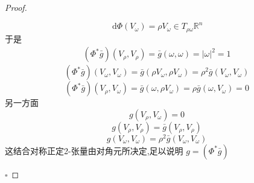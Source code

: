 \documentclass[../../几何与拓扑.tex]{subfiles}
\begin{document}
\begin{proof}
\begin{enumerate}
\[        \] \[
        \,\mathrm{d} \Phi \left( V_{ \omega } \right)= \rho V_{ \omega } \in T_{\rho  \omega }\mathbb{R} ^{n}
        \]于是 \[
        \begin{aligned}
            \left( \Phi ^{*} \bar{g} \right)\left( V_{\rho },V_{\rho } \right)= \bar{g}\left(  \omega , \omega  \right)   = \left|  \omega  \right|^{2}= 1 
        \end{aligned} 
        \] \[
        \left( \Phi ^{*}\bar{g} \right)\left( V_{ \omega },V_{ \omega } \right)= \bar{g}\left( \rho V_{ \omega },\rho V_{ \omega } \right)= \rho ^{2}\bar{g}\left( V_{ \omega },V_{ \omega } \right)    
        \] \[
        \left( \Phi ^{*}\bar{g} \right)\left( V_{\rho },V_{ \omega } \right)= \bar{g}\left(  \omega ,\rho V_{ \omega } \right)= \rho  \bar{g}\left(  \omega ,V_{ \omega } \right)= 0    
        \]另一方面 \[
        g\left(  V_{\rho },V_{ \omega } \right)=  0
        \]\[
        g\left( V_{\rho },V_{\rho } \right)= \bar{g}\left( V_{\rho },V_{\rho } \right)  
        \]\[
        g\left( V_{ \omega },V_{ \omega } \right)= \rho ^{2} \bar{g}\left( V_{ \omega },V_{ \omega } \right)  
        \]这结合对称正定2-张量由对角元所决定,足以说明 \(  g =  \left( \Phi ^{*} \bar{g}  \right)   \) 
  \end{enumerate}
  
    \hfill $\square$
\end{proof}

\hspace*{\fill} 
\end{document}
